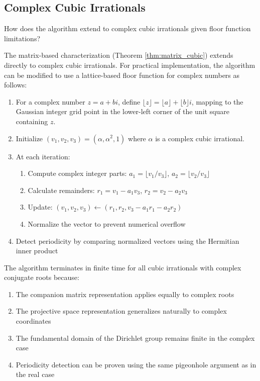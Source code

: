 \subsection{Complex Cubic Irrationals}

\begin{objection}
How does the algorithm extend to complex cubic irrationals given floor function limitations?
\end{objection}

\begin{response}
The matrix-based characterization (Theorem \ref{thm:matrix_cubic}) extends directly to complex cubic irrationals. For practical implementation, the \HAPD{} algorithm can be modified to use a lattice-based floor function for complex numbers as follows:

\begin{algorithm_def}
\begin{enumerate}
\item For a complex number $z = a + bi$, define $\lfloor z \rfloor = \lfloor a \rfloor + \lfloor b \rfloor i$, mapping to the Gaussian integer grid point in the lower-left corner of the unit square containing $z$.
\item Initialize $(v_1, v_2, v_3) = (\alpha, \alpha^2, 1)$ where $\alpha$ is a complex cubic irrational.
\item At each iteration:
   \begin{enumerate}
   \item Compute complex integer parts: $a_1 = \lfloor v_1/v_3 \rfloor$, $a_2 = \lfloor v_2/v_3 \rfloor$
   \item Calculate remainders: $r_1 = v_1 - a_1v_3$, $r_2 = v_2 - a_2v_3$
   \item Update: $(v_1, v_2, v_3) \leftarrow (r_1, r_2, v_3 - a_1r_1 - a_2r_2)$
   \item Normalize the vector to prevent numerical overflow
   \end{enumerate}
\item Detect periodicity by comparing normalized vectors using the Hermitian inner product
\end{enumerate}
\end{algorithm_def}

The algorithm terminates in finite time for all cubic irrationals with complex conjugate roots because:

\begin{enumerate}
\item The companion matrix representation applies equally to complex roots
\item The projective space representation generalizes naturally to complex coordinates
\item The fundamental domain of the Dirichlet group remains finite in the complex case
\item Periodicity detection can be proven using the same pigeonhole argument as in the real case
\end{enumerate}


\end{response}
